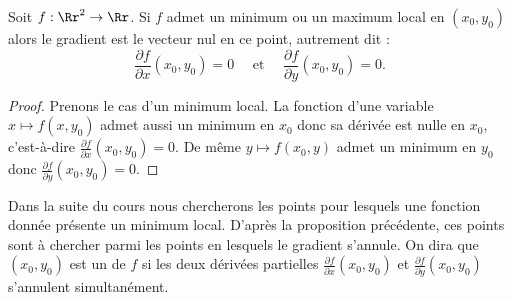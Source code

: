 \documentclass[11pt,class=report,crop=false]{standalone}
\begin{document}
\begin{proposition}
Soit $f : \Rr^2 \to \Rr$. Si $f$ admet un minimum ou un maximum local en $(x_0,y_0)$ alors le gradient est le vecteur nul en ce point, autrement dit :
$$
\frac{\partial f}{\partial x}(x_0,y_0) = 0 
\quad \text{ et  }\quad
\frac{\partial f}{\partial y}(x_0,y_0) = 0.
$$
\end{proposition}

\begin{proof}
Prenons le cas d'un minimum local.
La fonction d'une variable $x \mapsto f(x, y_0)$ admet aussi un minimum en $x_0$ donc sa dérivée est nulle en $x_0$, c'est-à-dire $\frac{\partial f}{\partial x}(x_0,y_0) = 0$. De même $y \mapsto f(x_0, y)$ admet un minimum en $y_0$ donc $\frac{\partial f}{\partial y}(x_0,y_0) = 0$. 
\end{proof}


Dans la suite du cours nous chercherons les points pour lesquels une fonction donnée présente un minimum local.
D'après la proposition précédente, ces points sont à chercher parmi les points en lesquels le gradient s'annule. On dira que $(x_0,y_0)$ est un  de $f$ si
les deux dérivées partielles $\frac{\partial f}{\partial x}(x_0,y_0)$ et $\frac{\partial f}{\partial y}(x_0,y_0)$ s'annulent simultanément.
\end{document}
